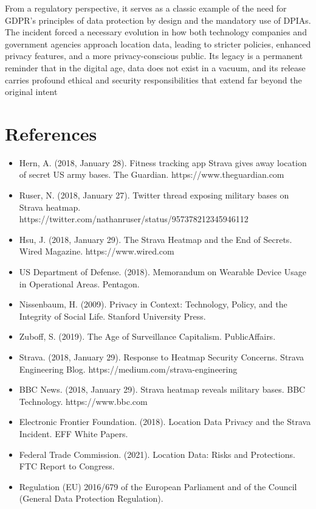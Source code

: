 \documentclass{article}
\begin{document}
From a regulatory perspective, it serves as a classic example of the need for GDPR's principles of data protection by design and the mandatory use of DPIAs. The incident forced a necessary evolution in how both technology companies and government agencies approach location data, leading to stricter policies, enhanced privacy features, and a more privacy-conscious public. Its legacy is a permanent reminder that in the digital age, data does not exist in a vacuum, and its release carries profound ethical and security responsibilities that extend far beyond the original intent

\section{References}

\begin{itemize}
\item Hern, A. (2018, January 28). Fitness tracking app Strava gives away location of secret US army bases. The Guardian. https://www.theguardian.com

\item Ruser, N. (2018, January 27). Twitter thread exposing military bases on Strava heatmap. https://twitter.com/nathanruser/status/957378212345946112

\item Hsu, J. (2018, January 29). The Strava Heatmap and the End of Secrets. Wired Magazine. https://www.wired.com

\item US Department of Defense. (2018). Memorandum on Wearable Device Usage in Operational Areas. Pentagon.

\item Nissenbaum, H. (2009). Privacy in Context: Technology, Policy, and the Integrity of Social Life. Stanford University Press.

\item Zuboff, S. (2019). The Age of Surveillance Capitalism. PublicAffairs.

\item Strava. (2018, January 29). Response to Heatmap Security Concerns. Strava Engineering Blog. https://medium.com/strava-engineering

\item BBC News. (2018, January 29). Strava heatmap reveals military bases. BBC Technology. https://www.bbc.com

\item Electronic Frontier Foundation. (2018). Location Data Privacy and the Strava Incident. EFF White Papers.

\item Federal Trade Commission. (2021). Location Data: Risks and Protections. FTC Report to Congress.

\item Regulation (EU) 2016/679 of the European Parliament and of the Council (General Data Protection Regulation).


\end{itemize}
\end{document}
